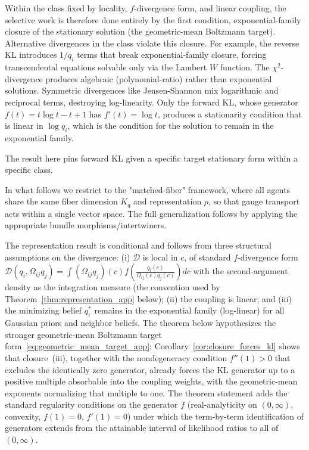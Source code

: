 \documentclass[11pt]{article}
\begin{document}
Within the class fixed by locality, $f$-divergence form, and linear coupling, the selective work is therefore done entirely by the first condition, exponential-family closure of the stationary solution (the geometric-mean Boltzmann target). Alternative divergences in the class violate this closure. For example, the reverse KL introduces $1/q_i$ terms that break exponential-family closure, forcing transcendental equations solvable only via the Lambert $W$ function. The $\chi^2$-divergence produces algebraic (polynomial-ratio) rather than exponential solutions. Symmetric divergences like Jensen-Shannon mix logarithmic and reciprocal terms, destroying log-linearity. Only the forward KL, whose generator $f(t) = t\log t - t + 1$ has $f'(t) = \log t$, produces a stationarity condition that is linear in $\log q_i$, which is the condition for the solution to remain in the exponential family.

The result here pins forward KL given a specific target stationary form within a specific class.

In what follows we restrict to the "matched-fiber" framework, where all agents share the same fiber dimension $K_q$ and representation $\rho$, so that gauge transport acts within a single vector space. The full generalization follows by applying the appropriate bundle morphisms/intertwiners.

The representation result is conditional and follows from three structural assumptions on the divergence: (i) $\mathcal{D}$ is local in $c$, of standard $f$-divergence form $\displaystyle \mathcal{D}(q_i, \Omega_{ij}q_j) = \int (\Omega_{ij}q_j)(c) f\left(\frac{q_i(c)}{\Omega_{ij}(c) q_j(c)}\right) dc$ with the second-argument density as the integration measure (the convention used by Theorem~\ref{thm:representation_app} below); (ii) the coupling is linear; and (iii) the minimizing belief $q_i^*$ remains in the exponential family (log-linear) for all Gaussian priors and neighbor beliefs. The theorem below hypothesizes the stronger geometric-mean Boltzmann target form~\eqref{eq:geometric_mean_target_app}; Corollary~\ref{cor:closure_forces_kl} shows that closure~(iii), together with the nondegeneracy condition $f''(1) > 0$ that excludes the identically zero generator, already forces the KL generator up to a positive multiple absorbable into the coupling weights, with the geometric-mean exponents normalizing that multiple to one. The theorem statement adds the standard regularity conditions on the generator $f$ (real-analyticity on $(0,\infty)$, convexity, $f(1)=0$, $f'(1)=0$) under which the term-by-term identification of generators extends from the attainable interval of likelihood ratios to all of $(0,\infty)$.
\end{document}
